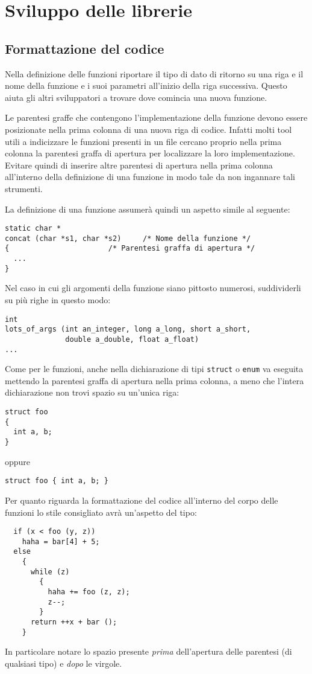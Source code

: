\section{Sviluppo delle librerie}

\subsection{Formattazione del codice}

Nella definizione delle funzioni riportare il tipo di dato di ritorno
su una riga e il nome della funzione e i suoi parametri all'inizio
della riga successiva. Questo aiuta gli altri sviluppatori a trovare
dove comincia una nuova funzione.

\smallskip
Le parentesi graffe che contengono l'implementazione della funzione
devono essere posizionate nella prima colonna di una nuova riga di
codice. Infatti molti tool utili a indicizzare le funzioni presenti in
un file cercano proprio nella prima colonna la parentesi graffa di
apertura per localizzare la loro implementazione. Evitare quindi di
inserire altre parentesi di apertura nella prima colonna all'interno
della definizione di una funzione in modo tale da non ingannare tali
strumenti.

La definizione di una funzione assumerà quindi un aspetto simile al
seguente:
\begin{lstlisting}
static char *
concat (char *s1, char *s2)     /* Nome della funzione */
{                       /* Parentesi graffa di apertura */
  ...
}
\end{lstlisting}
Nel caso in cui gli argomenti della funzione siano pittosto numerosi,
suddividerli su più righe in questo modo:
\begin{lstlisting}
int
lots_of_args (int an_integer, long a_long, short a_short,
              double a_double, float a_float)
...
\end{lstlisting}

\smallskip
Come per le funzioni, anche nella dichiarazione di tipi \texttt{struct}
o \texttt{enum} va eseguita mettendo la parentesi graffa di apertura
nella prima colonna, a meno che l'intera dichiarazione non trovi
spazio su un'unica riga:
\begin{lstlisting}
struct foo
{
  int a, b;
}
\end{lstlisting}
oppure
\begin{lstlisting}
struct foo { int a, b; }
\end{lstlisting}

Per quanto riguarda la formattazione del codice all'interno del corpo
delle funzioni lo stile consigliato avrà un'aspetto del tipo:
\begin{lstlisting}
  if (x < foo (y, z))
    haha = bar[4] + 5;
  else
    {
      while (z)
        {
          haha += foo (z, z);
          z--;
        }
      return ++x + bar ();
    }
\end{lstlisting}
In particolare notare lo spazio presente \emph{prima} dell'apertura
delle parentesi (di qualsiasi tipo) e \emph{dopo} le virgole. 

